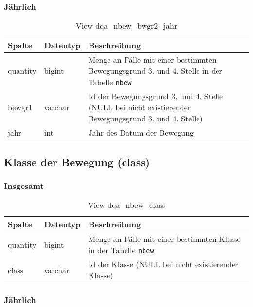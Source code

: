 \subsubsection{Jährlich} \label{subsubsec:bewg2J}

\begin{table}[ht]
	\centering   
	\caption{View dqa\_nbew\_bwgr2\_jahr}
	\label{tab:bewG2J}
	\begin{tabular}{||l|l|p{10cm}||}   		
		\hline
		Spalte & Datentyp & Beschreibung \\ [0.5ex]
		\hline\hline
		quantity & bigint & Menge an Fälle mit einer bestimmten Bewegungsgrund 3. und 4. Stelle in der Tabelle \texttt{nbew}\\
		\hline
		bewgr1 & varchar & Id der Bewegungsgrund 3. und 4. Stelle (NULL bei nicht existierender Bewegungsgrund 3. und 4. Stelle)\\
		\hline
		jahr & int &  Jahr des Datum der Bewegung \\
		\hline		
	\end{tabular}
\end{table}

\subsection{Klasse der Bewegung (class)} \label{subsec:bewclass}

\subsubsection{Insgesamt} \label{subsubsec:bewClassI}

\begin{table}[ht]
	\centering   
	\caption{View dqa\_nbew\_class}
	\label{tab:bewClassI}
	\begin{tabular}{||l|l|p{10cm}||}   		
		\hline
		Spalte & Datentyp & Beschreibung \\ [0.5ex]
		\hline\hline
		quantity & bigint & Menge an Fälle mit einer bestimmten Klasse in der Tabelle \texttt{nbew} \\
		\hline
		class & varchar & Id der Klasse (NULL bei nicht existierender Klasse)\\
		\hline
		
	\end{tabular}
\end{table}

\subsubsection{Jährlich} \label{subsubsec:bewClassJ}

